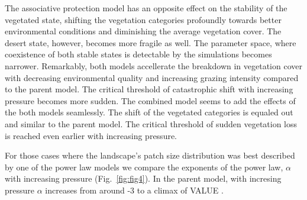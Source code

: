 The associative protection model has an opposite effect on the stability of the vegetated state, shifting the vegetation categories profoundly towards better environmental conditions and diminishing the average vegetation cover. The desert state, however, becomes more fragile as well. The parameter space, where coexistence of both stable states is detectable by the simulations becomes narrower.
Remarkably, both models accellerate the breakdown in vegetation cover with decreasing environmental quality and increasing grazing intensity compared to the parent model. The critical threshold of catastrophic shift with increasing pressure becomes more sudden.
The combined model seems to add the effects of the both models seamlessly. The shift of the vegetated categories is equaled out and similar to the parent model. The critical threshold of sudden vegetation loss is reached even earlier with increasing pressure. \par

For those cases where the landscape's patch size distribution was best described by one of the power law models we compare the exponents of the power law, $\alpha$ with increasing pressure (Fig.~\ref{fig:fig4}). In the parent model, with incresing pressure  $\alpha$ increases from around -3 to a climax of VALUE . 
 

